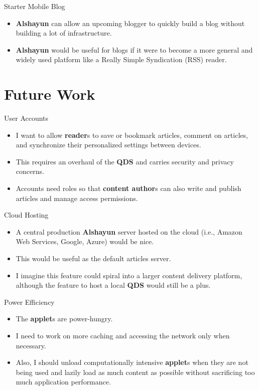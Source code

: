 \documentclass{beamer}
\begin{document}
\begin{frame}{Starter Mobile Blog}
    \begin{itemize}
        \item \textbf{Alshayun} can allow an upcoming blogger to quickly build a
            blog without building a lot of infrastructure.
        \item \textbf{Alshayun} would be useful for blogs if it were to become a
            more general and widely used platform like a Really Simple
            Syndication (RSS) reader.
    \end{itemize}
\end{frame}

\section{Future Work}

\begin{frame}{User Accounts}
    \begin{itemize}
        \item I want to allow \textbf{reader}s to save or bookmark articles,
            comment on articles, and synchronize their personalized settings
            between devices.
        \item This requires an overhaul of the \textbf{QDS} and carries security
            and privacy concerns.
        \item Accounts need roles so that \textbf{content author}s can also
            write and publish articles and manage access permissions.
    \end{itemize}
\end{frame}

\begin{frame}{Cloud Hosting}
    \begin{itemize}
        \item A central production \textbf{Alshayun} server hosted on the cloud
            (i.e., Amazon Web Services, Google, Azure) would be nice.
        \item This would be useful as the default articles server.
        \item I imagine this feature could spiral into a larger content delivery
            platform, although the feature to host a local \textbf{QDS} would
            still be a plus.
    \end{itemize}
\end{frame}

\begin{frame}{Power Efficiency}
    \begin{itemize}
        \item The \textbf{applet}s are power-hungry.
        \item I need to work on more caching and accessing the network only when
            necessary.
        \item Also, I should unload computationally intensive \textbf{applet}s
            when they are not being used and lazily load as much content as
            possible without sacrificing too much application performance.
    \end{itemize}
\end{frame}
\end{document}
